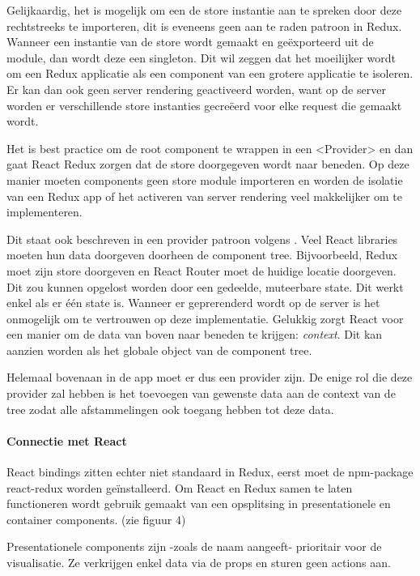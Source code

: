 Gelijkaardig, het is mogelijk om een de store instantie aan te spreken door deze rechtstreeks te importeren, dit is eveneens geen aan te raden patroon in Redux. Wanneer een instantie van de store wordt gemaakt en geëxporteerd uit de module, dan wordt deze een singleton. Dit wil zeggen dat het moeilijker wordt om een Redux applicatie als een component van een grotere applicatie te isoleren. Er kan dan ook geen server rendering geactiveerd worden, want op de server worden er verschillende store instanties gecreëerd voor elke request die gemaakt wordt.

Het is best practice om de root component te wrappen in een <Provider> en dan gaat React Redux zorgen dat de store doorgegeven wordt naar beneden. Op deze manier moeten components geen store module importeren en worden de isolatie van een Redux app of het activeren van server rendering veel makkelijker om te implementeren.
\autocite{Redux02}

Dit staat ook beschreven in een provider patroon volgens \textcite{provider}. Veel React libraries moeten hun data doorgeven doorheen de component tree. Bijvoorbeeld, Redux moet zijn store doorgeven en React Router moet de huidige locatie doorgeven. Dit zou kunnen opgelost worden door een gedeelde, muteerbare state. Dit werkt enkel als er één state is. Wanneer er geprerenderd wordt op de server is het onmogelijk om te vertrouwen op deze implementatie. Gelukkig zorgt React voor een manier om de data van boven naar beneden te krijgen: \textit{context}. Dit kan aanzien worden als het globale object van de component tree.

Helemaal bovenaan in de app moet er dus een provider zijn. De enige rol die deze provider zal hebben is het toevoegen van gewenste data aan de context van de tree zodat alle afstammelingen ook toegang hebben tot deze data.


\paragraph{Connectie met React}
React bindings zitten echter niet standaard in Redux, eerst moet de npm-package react-redux worden geïnstalleerd. Om React en Redux samen te laten functioneren wordt gebruik gemaakt van een opsplitsing in presentationele en container components. (zie figuur 4) 

Presentationele components zijn -zoals de naam aangeeft- prioritair voor de visualisatie. Ze verkrijgen enkel data via de props en sturen geen actions aan. 

